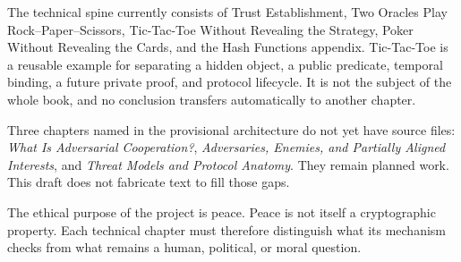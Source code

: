 The technical spine currently consists of Trust Establishment, Two Oracles
Play Rock--Paper--Scissors, Tic-Tac-Toe Without Revealing the Strategy, Poker
Without Revealing the Cards, and the Hash Functions appendix. Tic-Tac-Toe is a
reusable example for separating a hidden object, a public predicate, temporal
binding, a future private proof, and protocol lifecycle. It is not the subject
of the whole book, and no conclusion transfers automatically to another
chapter.

Three chapters named in the provisional architecture do not yet have source
files: \emph{What Is Adversarial Cooperation?}, \emph{Adversaries, Enemies,
and Partially Aligned Interests}, and \emph{Threat Models and Protocol
Anatomy}. They remain planned work. This draft does not fabricate text to fill
those gaps.

The ethical purpose of the project is peace. Peace is not itself a
cryptographic property. Each technical chapter must therefore distinguish
what its mechanism checks from what remains a human, political, or moral
question.
